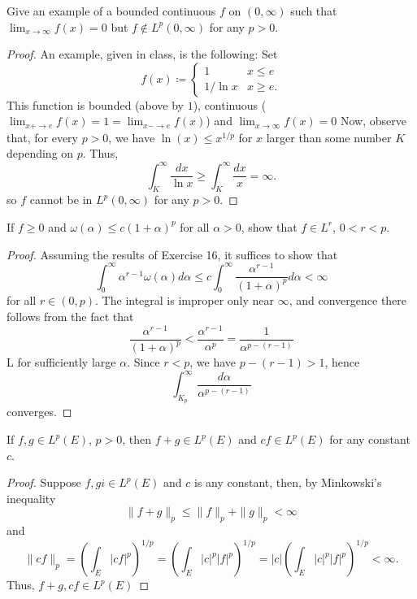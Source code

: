 \begin{problem}
Give an example of a bounded continuous $f$ on $(0,\infty)$ such that
$\lim_{x\to\infty}f(x)=0$ but $f\notin L^p(0,\infty)$ for any $p>0$.
\end{problem}
\begin{proof}
An example, given in class, is the following: Set
\begin{equation}
\label{eq:11:example}
f(x)\coloneqq
\begin{cases}
1&x\leq e\\
1/\ln x&x\geq e.
\end{cases}
\end{equation}
This function is bounded (above by $1$), continuous ($\lim_{x+\to
  e}f(x)=1=\lim_{x-\to e}f(x)$) and $\lim_{x\to\infty}f(x)=0$ Now, observe
that, for every $p>0$, we have $\ln(x)\leq x^{1/p}$ for $x$ larger than
some number $K$ depending on $p$. Thus,
\[
\int_K^\infty\frac{dx}{\ln x}\geq\int_K^\infty\frac{dx}{x}=\infty.
\]
so $f$ cannot be in $L^p(0,\infty)$ for any $p>0$.
\end{proof}
\newpage

\begin{problem}
If $f\geq 0$ and $\omega(\alpha)\leq c(1+\alpha)^p$ for all $\alpha>0$,
show that $f\in L^r$, $0<r<p$.
\end{problem}
\begin{proof}
Assuming the results of Exercise 16, it suffices to show that
\begin{equation}
\label{eq:11:need-to-show}
\int_0^\infty\alpha^{r-1}\omega(\alpha)d\alpha\leq c\int_0^\infty\frac{\alpha^{r-1}}{(1+\alpha)^p}d\alpha<\infty
\end{equation}
for all $r\in(0,p)$. The integral is improper only near $\infty$, and
convergence there follows from the fact that
\[
\frac{\alpha^{r-1}}{(1+\alpha)^p}<\frac{\alpha^{r-1}}{\alpha^p}=\frac{1}{\alpha^{p-(r-1)}}
\]L
for sufficiently large $\alpha$. Since $r<p$, we have $p-(r-1)>1$, hence
\[
\int_{K_p}^\infty\frac{d\alpha}{\alpha^{p-(r-1)}}
\]
converges.
\end{proof}
\newpage
\begin{problem}
 If $f,g\in L^p(E)$, $p>0$, then $f+g\in L^p(E)$ and $cf\in L^p(E)$ for any constant $c$.
\end{problem}
\begin{proof}
Suppose $f,gi\in L^p(E)$ and $c$ is any constant, then, by Minkowski's
inequality
\[
\|f+g\|_p\leq\|f\|_p+\|g\|_p<\infty
\]
and
\[
\|cf\|_p=\left(\int_E|cf|^p\right)^{1/p}=
\left(\int_E|c|^p|f|^p\right)^{1/p}=
|c|\left(\int_E|c|^p|f|^p\right)^{1/p}<\infty.
\]
Thus, $f+g,cf\in L^p(E)$
\end{proof}

